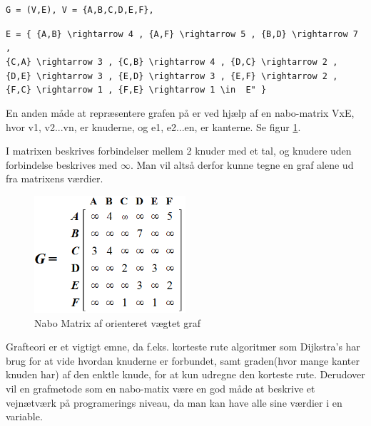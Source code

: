 \vspace{5mm}

\verb!G = (V,E), V = {A,B,C,D,E,F},! 

\vspace{5mm}

\verb!E = { {A,B} \rightarrow 4 , {A,F} \rightarrow 5 , {B,D} \rightarrow 7 , ! \\
\verb!{C,A} \rightarrow 3 , {C,B} \rightarrow 4 , {D,C} \rightarrow 2 ,!
\verb!{D,E} \rightarrow 3 , {E,D} \rightarrow 3 , {E,F} \rightarrow 2 , !
\verb!{F,C} \rightarrow 1 , {F,E} \rightarrow 1 \in  E" }!

\vspace{5mm}

En anden måde at repræsentere grafen på er ved hjælp af en nabo-matrix VxE, hvor v1, v2...vn, er knuderne, og e1, e2...en, er kanterne. Se figur \ref{fig:adjacency-matrix-weighted-directed-graph}. 

I matrixen beskrives forbindelser mellem 2 knuder med et tal, og knudere uden forbindelse beskrives med $\infty$. Man vil altså derfor kunne tegne en graf alene ud fra matrixens værdier.

\begin{figure}[H]
\begin{adjustbox}{width=0.5\textwidth,center=\textwidth}
\centering
\includegraphics[width=0.5\textwidth]{Pictures/Teoriafsnit/Figurfiler/adjacency_matrix_weighted_directed_graph.PNG}
\end{adjustbox}
\caption{Nabo Matrix af orienteret vægtet graf}
\label{fig:adjacency-matrix-weighted-directed-graph}
\end{figure}

Grafteori er et vigtigt emne, da f.eks. korteste rute algoritmer som Dijkstra's har brug for at vide hvordan knuderne er forbundet, samt graden(hvor mange kanter knuden har) af den enktle knude, for at kun udregne den korteste rute. Derudover vil en grafmetode som en nabo-matix være en god måde at beskrive et vejnætværk på programerings niveau, da man kan have alle sine værdier i en variable.


